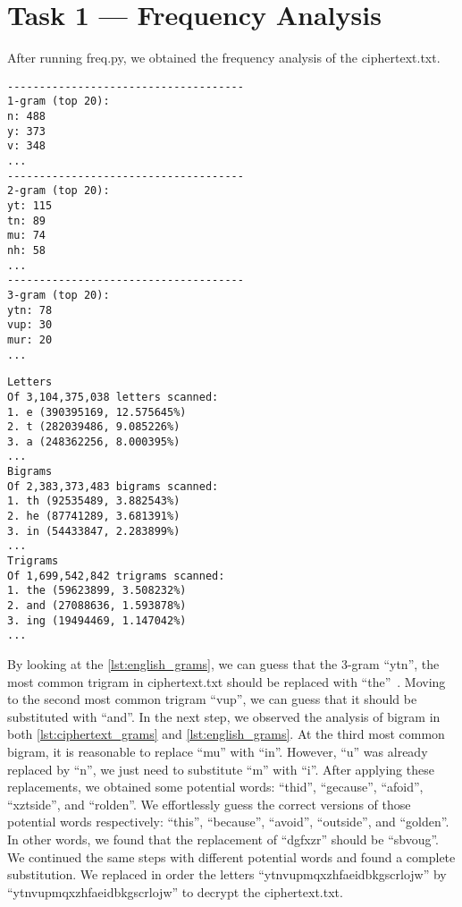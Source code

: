 \section{Task 1 --- Frequency Analysis}
%
After running {\selectfont freq.py}, we obtained
the frequency analysis of the {\selectfont ciphertext.txt}.

\begin{lstlisting}[caption=Top most common grams in
    {\fontfamily{qcr}\selectfont ciphertext.txt}, label={lst:ciphertext_grams}]
-------------------------------------
1-gram (top 20):
n: 488
y: 373
v: 348
...
-------------------------------------
2-gram (top 20):
yt: 115
tn: 89
mu: 74
nh: 58
...
-------------------------------------
3-gram (top 20):
ytn: 78
vup: 30
mur: 20
...
\end{lstlisting}

\begin{lstlisting}[caption=Top most common grams in
    English~\cite{freq_analysis}., label={lst:english_grams}]
Letters
Of 3,104,375,038 letters scanned:
1. e (390395169, 12.575645%)
2. t (282039486, 9.085226%)
3. a (248362256, 8.000395%)
...
Bigrams
Of 2,383,373,483 bigrams scanned:
1. th (92535489, 3.882543%)
2. he (87741289, 3.681391%)
3. in (54433847, 2.283899%)
...
Trigrams
Of 1,699,542,842 trigrams scanned:
1. the (59623899, 3.508232%)
2. and (27088636, 1.593878%)
3. ing (19494469, 1.147042%)
...
\end{lstlisting}

By looking at the \autoref{lst:english_grams}, we
can guess that the 3-gram ``ytn'', the most common trigram in {
\selectfont ciphertext.txt} should be replaced with ``the''~\cite{freq_analysis}.
Moving to the second most common trigram ``vup'', we can guess that it should
be substituted with ``and''. In the next step, we observed the analysis of bigram
in both \autoref{lst:ciphertext_grams} and \autoref{lst:english_grams}.
At the third most common bigram, it is reasonable to replace ``mu'' with
``in''. However, ``u'' was already replaced by ``n'', we just need to substitute
``m'' with ``i''. After applying these replacements, we obtained some
potential words: ``thid'', ``gecause'', ``afoid'', ``xztside'', and ``rolden''.
We effortlessly guess the correct versions of those potential words respectively:
``this'', ``because'', ``avoid'', ``outside'', and ``golden''. In other words,
we found that the replacement of ``dgfxzr'' should be ``sbvoug''. We continued
the same steps with different potential words and found a complete substitution.
We replaced in order the letters ``ytnvupmqxzhfaeidbkgscrlojw'' by
``ytnvupmqxzhfaeidbkgscrlojw'' to decrypt the {\selectfont ciphertext.txt}.

